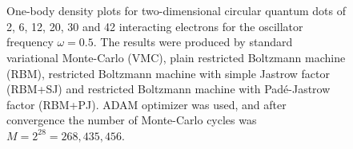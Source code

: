 \begin{figure}[H]
	\centering
	\\
	
	\\
	
	
	\caption{One-body density plots for two-dimensional circular quantum dots of 2, 6, 12, 20, 30 and 42 interacting electrons for the oscillator frequency $\omega=0.5$. The results were produced by standard variational Monte-Carlo (VMC), plain restricted Boltzmann machine (RBM), restricted Boltzmann machine with simple Jastrow factor (RBM+SJ) and restricted Boltzmann machine with Padé-Jastrow factor (RBM+PJ). ADAM optimizer was used, and after convergence the number of Monte-Carlo cycles was $M=2^{28}=268,435,456$.}%
	\label{fig:OB_interaction_2D_0p5w}
\end{figure}
